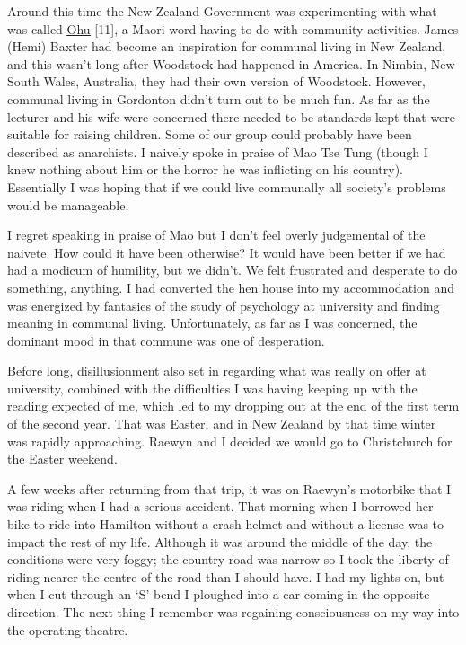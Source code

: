 Around this time the New Zealand Government was experimenting with what
was called \href{https://en.wikipedia.org/wiki/Ohu}{\underline{Ohu}}
{[}11{]}, a Maori word having to do with community activities. James
(Hemi) Baxter had become an inspiration for communal living in New
Zealand, and this wasn't long after Woodstock had happened in America.
In Nimbin, New South Wales, Australia, they had their own version of
Woodstock. However, communal living in Gordonton didn't turn out to be
much fun. As far as the lecturer and his wife were concerned there
needed to be standards kept that were suitable for raising children.
Some of our group could probably have been described as anarchists. I
naively spoke in praise of Mao Tse Tung (though I knew nothing about him
or the horror he was inflicting on his country). Essentially I was
hoping that if we could live communally all society's problems would be
manageable.

I regret speaking in praise of Mao but I don't feel overly judgemental
of the naivete. How could it have been otherwise? It would have been
better if we had had a modicum of humility, but we didn't. We felt
frustrated and desperate to do something, anything. I had converted the
hen house into my accommodation and was energized by fantasies of the
study of psychology at university and finding meaning in communal
living. Unfortunately, as far as I was concerned, the dominant mood in
that commune was one of desperation.

Before long, disillusionment also set in regarding what was really on
offer at university, combined with the difficulties I was having keeping
up with the reading expected of me, which led to my dropping out at the
end of the first term of the second year. That was Easter, and in New
Zealand by that time winter was rapidly approaching. Raewyn and I
decided we would go to Christchurch for the Easter weekend.

A few weeks after returning from that trip, it was on Raewyn's motorbike
that I was riding when I had a serious accident. That morning when I
borrowed her bike to ride into Hamilton without a crash helmet and
without a license was to impact the rest of my life. Although it was
around the middle of the day, the conditions were very foggy; the
country road was narrow so I took the liberty of riding nearer the
centre of the road than I should have. I had my lights on, but when I
cut through an `S' bend I ploughed into a car coming in the opposite
direction. The next thing I remember was regaining consciousness on my
way into the operating theatre.

